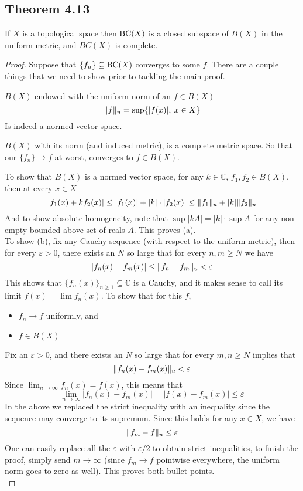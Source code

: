 \documentclass[../../main.tex]{subfiles}
\begin{document}
\subsection{Theorem 4.13}
\begin{wts}
If $X$ is a topological space then $\operatorname{BC}({X})$ is a closed subspace of $B(X)$ in the uniform metric, and $BC(X)$ is complete.
\end{wts}
\begin{proof}
Suppose that $\{f_n\}\subseteq\operatorname{BC}({X})$ converges to some $f$. There are a couple things that we need to show prior to tackling the main proof.
\begin{enumalpha}
    \item $B(X)$ endowed with the uniform norm of an $f\in B(X)$
    \[
    \lVert {f} \rVert_u = \sup \{|f(x)|,\: x\in X\}
    \]
    Is indeed a normed vector space.
    \item $B(X)$ with its norm (and induced metric), is a complete metric space. So that our $\{f_n\}\to f$ at worst, converges to $f\in B(X)$.
\end{enumalpha}
    To show that $B(X)$ is a normed vector space, for any $k\in \mathbb{C}$, $f_1, f_2\in B(X)$, then at every $x\in X$
    \[
    |f_1(x) + kf_2(x)|\leq |f_1(x)| + |k|\cdot|f_2(x)|\leq \lVert {f_1} \rVert_u + |k|\lVert {f_2} \rVert_u
    \]
    And to show absolute homogeneity, note that $\sup{|kA|} = |k|\cdot\sup{A}$ for any non-empty bounded above set of reals $A$. This proves (a).\\
    
    To show (b), fix any Cauchy sequence (with respect to the uniform metric), then for every $\varepsilon>0$, there exists an $N$ so large that for every $n,m\geq N$ we have
    \[
    |f_n(x)-f_m(x)|\leq \lVert {f_n-f_m} \rVert_u<\varepsilon
    \]
    This shows that $\{f_n(x)\}_{n\geq 1}\subseteq \mathbb{C}$ is a Cauchy, and it makes sense to call its limit $f(x) = \lim f_n(x)$. To show that for this $f$,
    \begin{itemize}
        \item $f_n\to f$ uniformly, and
        \item $f\in B(X)$
    \end{itemize}
    Fix an $\varepsilon>0$, and there exists an $N$ so large that for every $m, n\geq N$ implies that
    \[
    \lVert {f_n(x)-f_m(x)} \rVert_u < \varepsilon
    \]
    Since $\lim_{n\to\infty}f_n(x) = f(x)$, this means that
    \[
    \lim_{n\to\infty}|f_n(x)-f_m(x)|=|f(x)-f_m(x)|\leq\varepsilon
    \]
    In the above we replaced the strict inequality with an inequality since the sequence may converge to its supremum. Since this holds for any $x\in X$, we have
    \[
    \lVert {f_m-f} \rVert_u\leq\varepsilon
    \]
    One can easily replace all the $\varepsilon$ with $\varepsilon/2$ to obtain strict inequalities, to finish the proof, simply send $m\to\infty$ (since $f_m\to f$ pointwise everywhere, the uniform norm goes to zero as well). This proves both bullet points.\\
    

\end{proof}
\end{document}
